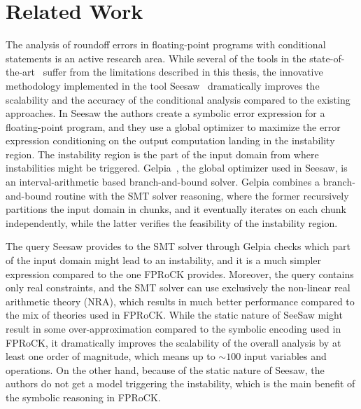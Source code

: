 \chapter{Related Work}
\setupuuchapterbib
%
The analysis of roundoff errors in floating-point programs with conditional statements is an active research area.
%
While several of the tools in the state-of-the-art~\cite{darulova2018daisy, precisa, fluctuat} suffer from the limitations described in this thesis, the innovative methodology implemented in the tool Seesaw~\cite{seesaw} dramatically improves the scalability and the accuracy of the conditional analysis compared to the existing approaches.
%
In Seesaw the authors create a symbolic error expression for a floating-point program, and they use a global optimizer to maximize the error expression conditioning on the output computation landing in the instability region.
%
The instability region is the part of the input domain from where instabilities might be triggered.
%
Gelpia~\cite{gelpia}, the global optimizer used in Seesaw, is an interval-arithmetic based branch-and-bound solver. 
%
Gelpia combines a branch-and-bound routine with the SMT solver reasoning, where the former recursively partitions the input domain in chunks, and it eventually iterates on each chunk independently, while the latter verifies the feasibility of the instability region. 
%

The query Seesaw provides to the SMT solver through Gelpia checks which part of the input domain might lead to an instability, and it is a much simpler expression compared to the one FPRoCK provides.
%
Moreover, the query contains only real constraints, and the SMT solver can use exclusively the non-linear real arithmetic theory (NRA), which results in much better performance compared to the mix of theories used in FPRoCK.
%
While the static nature of SeeSaw might result in some over-approximation compared to the symbolic encoding used in FPRoCK, it dramatically improves the scalability of the overall analysis by at least one order of magnitude, which means up to $\sim100$ input variables and operations.
%
On the other hand, because of the static nature of Seesaw, the authors do not get a model triggering the instability, which is the main benefit of the symbolic reasoning in FPRoCK.
%
%
%
%
%
%
%
%
%
%

